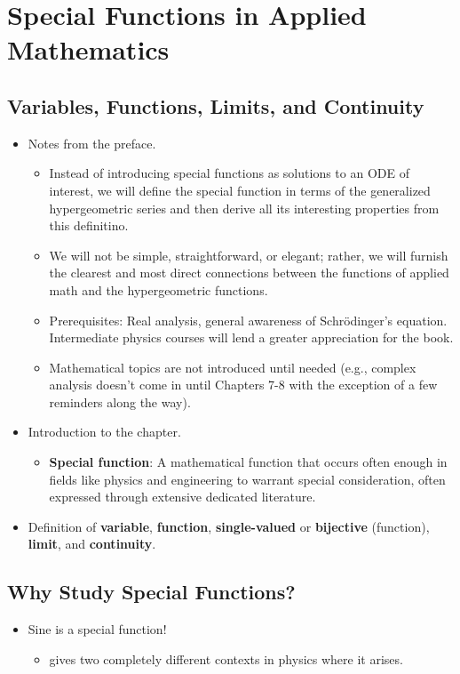 \documentclass[../finalProject.tex]{subfiles}
\begin{document}
\section{Special Functions in Applied Mathematics}
\subsection{Variables, Functions, Limits, and Continuity}
\begin{itemize}
    \item {}Notes from the preface.
    \begin{itemize}
        \item Instead of introducing special functions as solutions to an ODE of interest, we will define the special function in terms of the generalized hypergeometric series and then derive all its interesting properties from this definitino.
        \item We will not be simple, straightforward, or elegant; rather, we will furnish the clearest and most direct connections between the functions of applied math and the hypergeometric functions.
        \item Prerequisites: Real analysis, general awareness of Schr\"{o}dinger's equation. Intermediate physics courses will lend a greater appreciation for the book.
        \item Mathematical topics are not introduced until needed (e.g., complex analysis doesn't come in until Chapters 7-8 with the exception of a few reminders along the way).
    \end{itemize}
    \item Introduction to the chapter.
    \begin{itemize}
        \item \textbf{Special function}: A mathematical function that occurs often enough in fields like physics and engineering to warrant special consideration, often expressed through extensive dedicated literature.
    \end{itemize}
    \item Definition of \textbf{variable}, \textbf{function}, \textbf{single-valued} or \textbf{bijective} (function), \textbf{limit}, and \textbf{continuity}.
\end{itemize}


\subsection{Why Study Special Functions?}
\begin{itemize}
    \item Sine is a special function!
    \begin{itemize}
        \item \textcite{bib:Seaborn} gives two completely different contexts in physics where it arises.
    \end{itemize}
\end{itemize}
\end{document}
